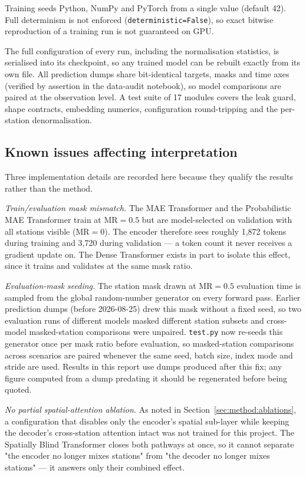 Training seeds Python, NumPy and PyTorch from a single value (default 42).
Full determinism is not enforced (\texttt{deterministic=False}), so exact
bitwise reproduction of a training run is not guaranteed on GPU.

The full configuration of every run, including the normalisation statistics, is
serialised into its checkpoint, so any trained model can be rebuilt exactly from
its own file. All prediction dumps share bit-identical targets, masks and time
axes (verified by assertion in the data-audit notebook), so model comparisons
are paired at the observation level. A test suite of 17 modules covers the leak
guard, shape contracts, embedding numerics, configuration round-tripping and
the per-station denormalisation.

\subsection{Known issues affecting interpretation}
\label{sec:setup:known-issues}

Three implementation details are recorded here because they qualify the
results rather than the method.

\emph{Train/evaluation mask mismatch.} The MAE Transformer and the
Probabilistic MAE Transformer train at $\text{MR} = 0.5$ but are
model-selected on validation with all stations visible ($\text{MR} = 0$).
The encoder therefore sees roughly 1{,}872 tokens during training and 3{,}720
during validation --- a token count it never receives a gradient update on.
The Dense Transformer exists in part to isolate this effect, since it trains
and validates at the same mask ratio.

\emph{Evaluation-mask seeding.} The station mask drawn at $\text{MR} = 0.5$
evaluation time is sampled from the global random-number generator on every
forward pass. Earlier prediction dumps (before 2026-08-25) drew this mask
without a fixed seed, so two evaluation runs of different models masked
different station subsets and cross-model masked-station comparisons were
unpaired. \texttt{test.py} now re-seeds this generator once per mask ratio
before evaluation, so masked-station comparisons across scenarios are paired
whenever the same seed, batch size, index mode and stride are used. Results
in this report use dumps produced after this fix; any figure computed from a
dump predating it should be regenerated before being quoted.

\emph{No partial spatial-attention ablation.} As noted in
Section~\ref{sec:method:ablations}, a configuration that disables only the
encoder's spatial sub-layer while keeping the decoder's cross-station
attention intact was not trained for this project. The Spatially Blind
Transformer closes both pathways at once, so it cannot separate "the encoder
no longer mixes stations" from "the decoder no longer mixes stations" --- it
answers only their combined effect.
